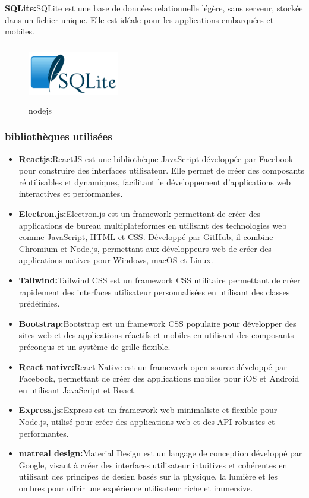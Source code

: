 \documentclass[edit,12pt,a4paper,ChapStyle,oneside,doubleinterligne]{report}
\begin{document}
\textbf{SQLite:}SQLite est une base de données relationnelle légère, sans serveur, stockée dans un fichier unique. Elle est idéale pour les applications embarquées et mobiles.\cite{sqlite}
    \begin{figure}[H]\label{fig:nodejs}
        \centering
        \includegraphics[width=4cm , height = 2.5cm , angle=360]{images/SQLite370.png}
        \caption{nodejs}
        \end{figure}
\subsubsection{bibliothèques utilisées}
\begin{itemize}
    \item \textbf{Reactjs:}ReactJS est une bibliothèque JavaScript développée par Facebook pour construire des interfaces utilisateur. Elle permet de créer des composants réutilisables et dynamiques, facilitant le développement d'applications web interactives et performantes.\cite{reactjs}
    \item \textbf{Electron.js:}Electron.js est un framework permettant de créer des applications de bureau multiplateformes en utilisant des technologies web comme JavaScript, HTML et CSS. Développé par GitHub, il combine Chromium et Node.js, permettant aux développeurs web de créer des applications natives pour Windows, macOS et Linux.\cite{electron}
    \item \textbf{Tailwind:}Tailwind CSS est un framework CSS utilitaire permettant de créer rapidement des interfaces utilisateur personnalisées en utilisant des classes prédéfinies.\cite{tailwind}
    \item \textbf{Bootstrap:}Bootstrap est un framework CSS populaire pour développer des sites web et des applications réactifs et mobiles en utilisant des composants préconçus et un système de grille flexible.\cite{Bootstrap}
    \item \textbf{React native:}React Native est un framework open-source développé par Facebook, permettant de créer des applications mobiles pour iOS et Android en utilisant JavaScript et React.\cite{reactn}
    \item \textbf{Express.js:}Express est un framework web minimaliste et flexible pour Node.js, utilisé pour créer des applications web et des API robustes et performantes.\cite{express}
    \item \textbf{matreal design:}Material Design est un langage de conception développé par Google, visant à créer des interfaces utilisateur intuitives et cohérentes en utilisant des principes de design basés sur la physique, la lumière et les ombres pour offrir une expérience utilisateur riche et immersive.\cite{matreal}
\end{itemize}
\end{document}
